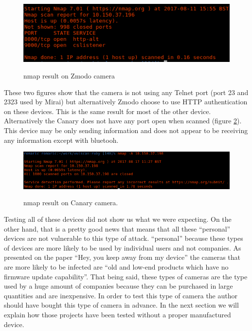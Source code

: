 \documentclass{report}
\begin{document}
\begin{figure}[h]
 \caption{nmap result on Zmodo camera}
 \centering
 \includegraphics[width=1.2\textwidth]{./img/exp/resultelse}
 \label{fig:resultelse-zm}
\end{figure}
These two figures show that the camera is not using any Telnet port (port 23 and 2323 used by Mirai) but alternatively Zmodo choose to use HTTP authentication on these devices. This is the same result for most of the other device.\newline
Alternatively the Canary does not have any port open when scanned (figure \ref{fig:canary}). This device may be only sending information and does not appear to be receiving any information except with bluetooh.
\newpage
\begin{figure}[h]
 \caption{nmap result on Canary \protect\footnotemark camera.}
 \centering
 \includegraphics[width=1.2\textwidth]{./img/exp/canary}
 \label{fig:canary}
\end{figure}


Testing all of these devices did not show us what we were expecting. On the other hand, that is a pretty good news that means that all these ``personal'' devices are not vulnerable to this type of attack. ``personal'' because these types of devices are more likely to be used by individual users and not companies. As presented on the paper ``Hey, you keep away from my device'' \autocite{cao2017hey} the cameras that are more likely to be infected are ``old and low-end products which have no firmware update capability''. That being said, these types of cameras are the type used by a huge amount of companies because they can be purchased in large quantities and are inexpensive. In order to test this type of camera the author should have bought this type of camera in advance.\newline
In the next section we will explain how those projects have been tested without a proper manufactured device.
\end{document}
